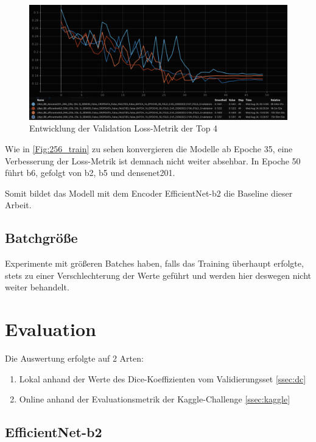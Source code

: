 \begin{figure}[H]
	\begin{center}
		\includegraphics[width=400pt]{LaTex/bilder/256_val_loss.png}
		\caption{Entwicklung der Validation Loss-Metrik der Top 4}\label{Fig:256_train}
	\end{center}
\end{figure}

Wie in \autoref{Fig:256_train} zu sehen konvergieren die Modelle ab Epoche 35, eine Verbesserung der Loss-Metrik ist demnach nicht weiter absehbar. In Epoche 50 führt b6, gefolgt von b2, b5 und densenet201. 

Somit bildet das Modell mit dem Encoder EfficientNet-b2 die Baseline dieser Arbeit.

\subsection{Batchgröße}

Experimente mit größeren Batches haben, falls das Training überhaupt erfolgte, stets zu einer Verschlechterung der Werte geführt und werden hier deswegen nicht weiter behandelt.

\pagebreak

\section{Evaluation}\raggedbottom

Die Auswertung erfolgte auf 2 Arten:
\begin{enumerate}
\item Lokal anhand der Werte des Dice-Koeffizienten vom Validierungsset \ref{ssec:dc}
\item Online anhand der Evaluationsmetrik der Kaggle-Challenge \ref{ssec:kaggle}
\end{enumerate}

\subsection{EfficientNet-b2}

